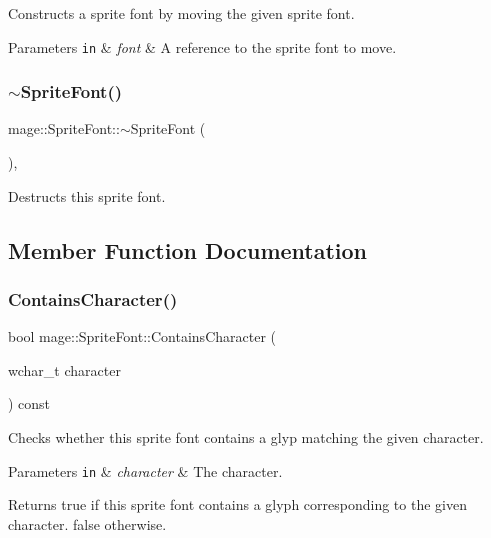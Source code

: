 Constructs a sprite font by moving the given sprite font.


\begin{DoxyParams}[1]{Parameters}
\mbox{\tt in}  & {\em font} & A reference to the sprite font to move. \\
\hline
\end{DoxyParams}
\hypertarget{classmage_1_1_sprite_font_acbf50687b4a5dbb2ff1ad73ecc89b7f1}{}\label{classmage_1_1_sprite_font_acbf50687b4a5dbb2ff1ad73ecc89b7f1} 
\subsubsection{\texorpdfstring{$\sim$\+Sprite\+Font()}{~SpriteFont()}}
{\footnotesize\ttfamily mage\+::\+Sprite\+Font\+::$\sim$\+Sprite\+Font (\begin{DoxyParamCaption}{ }\end{DoxyParamCaption})\hspace{0.3cm}{\ttfamily [virtual]}, {\ttfamily [default]}}

Destructs this sprite font. 

\subsection{Member Function Documentation}
\hypertarget{classmage_1_1_sprite_font_a01836c4197661dbdd66c624d8dc6a7c3}{}\label{classmage_1_1_sprite_font_a01836c4197661dbdd66c624d8dc6a7c3} 
\subsubsection{\texorpdfstring{Contains\+Character()}{ContainsCharacter()}}
{\footnotesize\ttfamily bool mage\+::\+Sprite\+Font\+::\+Contains\+Character (\begin{DoxyParamCaption}\item[{wchar\+\_\+t}]{character }\end{DoxyParamCaption}) const}

Checks whether this sprite font contains a glyp matching the given character.


\begin{DoxyParams}[1]{Parameters}
\mbox{\tt in}  & {\em character} & The character. \\
\hline
\end{DoxyParams}
\begin{DoxyReturn}{Returns}
{\ttfamily true} if this sprite font contains a glyph corresponding to the given character. {\ttfamily false} otherwise. 
\end{DoxyReturn}
\hypertarget{classmage_1_1_sprite_font_a4d919aa90bc5ffe084c2d662297d03c4}{}\label{classmage_1_1_sprite_font_a4d919aa90bc5ffe084c2d662297d03c4} 
